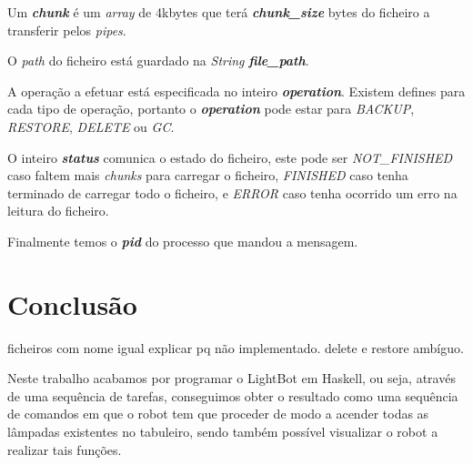 \documentclass[12pt,a4paper]{report}
\begin{document}
\hspace{0cm}\par
Um \emph{\bfseries{chunk}} é um \emph{array} de 4kbytes que terá \emph{\bfseries{chunk\_size}} bytes do ficheiro a transferir pelos \emph{pipes}. \par
O \emph{path} do ficheiro está guardado na \emph{String} \emph{\bfseries{file\_path}}. \par
A operação a efetuar está especificada no inteiro \emph{\bfseries{operation}}. Existem defines para cada tipo de operação, portanto o \emph{\bfseries{operation}} pode estar para \emph{BACKUP}, \emph{RESTORE}, \emph{DELETE} ou \emph{GC}. \par
O inteiro \emph{\bfseries{status}} comunica o estado do ficheiro, este pode ser \emph{NOT\_FINISHED} caso faltem mais \emph{chunks} para carregar o ficheiro, \emph{FINISHED} caso tenha terminado de carregar todo o ficheiro, e \emph{ERROR} caso tenha ocorrido um erro na leitura do ficheiro.\par
Finalmente temos o \emph{\bfseries{pid}} do processo que mandou a mensagem.


\chapter{Conclusão}
ficheiros com nome igual explicar pq não implementado. delete e restore ambíguo. 

Neste trabalho acabamos por programar o LightBot em Haskell, ou seja, através de uma sequência de tarefas, conseguimos obter o resultado como uma sequência de comandos em que o robot tem que proceder de modo a acender todas as lâmpadas existentes no tabuleiro, sendo também possível visualizar o robot a realizar tais funções.
\end{document}
